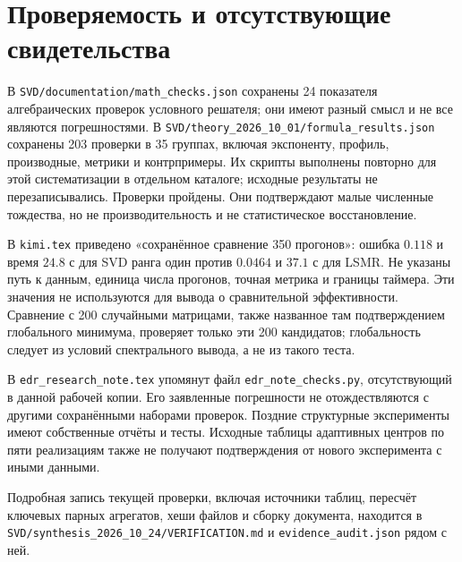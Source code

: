 \documentclass[11pt,a4paper]{article}
\numberwithin{equation}{section}
\newcommand{\file}[1]{\nolinkurl{#1}}
\begin{document}
\section{Проверяемость и отсутствующие свидетельства}\label{sec:audit}

В \file{SVD/documentation/math_checks.json} сохранены 24 показателя
алгебраических проверок условного решателя; они имеют разный смысл
и не все являются погрешностями. В
\file{SVD/theory_2026_10_01/formula_results.json} сохранены 203 проверки
в 35 группах, включая экспоненту, профиль, производные, метрики
и контрпримеры. Их скрипты выполнены повторно для этой систематизации
в отдельном каталоге; исходные результаты не перезаписывались.
Проверки пройдены. Они подтверждают малые численные тождества,
но не производительность и не статистическое восстановление.

В \file{kimi.tex} приведено «сохранённое сравнение 350 прогонов»:
ошибка $0.118$ и время $24.8$ с для SVD ранга один против
$0.0464$ и $37.1$ с для LSMR. Не указаны путь к данным,
единица числа прогонов, точная метрика и границы таймера.
Эти значения не используются для вывода о сравнительной эффективности.
Сравнение с 200 случайными матрицами, также названное там
подтверждением глобального минимума, проверяет только эти 200
кандидатов; глобальность следует из условий спектрального вывода,
а не из такого теста.

В \file{edr_research_note.tex} упомянут файл
\file{edr_note_checks.py}, отсутствующий в данной рабочей копии.
Его заявленные погрешности не отождествляются с другими сохранёнными
наборами проверок. Поздние структурные эксперименты имеют собственные
отчёты и тесты. Исходные таблицы адаптивных центров по пяти реализациям
также не получают подтверждения от нового эксперимента с иными данными.

Подробная запись текущей проверки, включая источники таблиц,
пересчёт ключевых парных агрегатов, хеши файлов и сборку документа,
находится в \file{SVD/synthesis_2026_10_24/VERIFICATION.md}
и \file{evidence_audit.json} рядом с ней.
\end{document}
